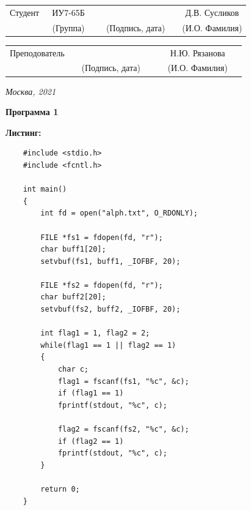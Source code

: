 \documentclass[14pt, a4paper]{extarticle}
\begin{document}
\noindent
{}
\\


\noindent
{}
\\

\vspace{1.5cm}
\noindent
\begin{tabular}{l c c c c c}
	Студент      & ~ИУ7-65Б~               & \hspace{2.5cm} & \hspace{2cm}                 & &  Д.В. Сусликов \\\cline{2-2}\cline{4-4} \cline{6-6} 
	\hspace{3cm} & {\footnotesize(Группа)} &                & {\footnotesize(Подпись, дата)} & & {\footnotesize(И.О. Фамилия)}
\end{tabular}

\noindent
\begin{tabular}{l c c c c}
	Преподователь & \hspace{5cm}   & \hspace{2cm}                 & & ~~~Н.Ю. Рязанова~~~\\\cline{3-3} \cline{5-5} 
	\hspace{3cm}  &                & {\footnotesize(Подпись, дата)} & & {\footnotesize(И.О. Фамилия)}
\end{tabular}

\vspace{0.6cm}
\begin{center}	
	\vfill
	\large \textit {Москва, 2021}
\end{center}

\thispagestyle {empty}
\pagebreak

\clearpage
\textbf{Программа 1} \par

\textbf{Листинг:}
\begin{lstlisting}
	#include <stdio.h>
	#include <fcntl.h>
	
	int main()
	{
		int fd = open("alph.txt", O_RDONLY);
		
		FILE *fs1 = fdopen(fd, "r");
		char buff1[20];
		setvbuf(fs1, buff1, _IOFBF, 20);
		
		FILE *fs2 = fdopen(fd, "r");
		char buff2[20];
		setvbuf(fs2, buff2, _IOFBF, 20);
		
		int flag1 = 1, flag2 = 2;
		while(flag1 == 1 || flag2 == 1)
		{
			char c;
			flag1 = fscanf(fs1, "%c", &c);
			if (flag1 == 1)
			fprintf(stdout, "%c", c);
			
			flag2 = fscanf(fs2, "%c", &c);
			if (flag2 == 1) 
			fprintf(stdout, "%c", c); 
		}
		
		return 0;
	}
\end{lstlisting}\newpage
\end{document}
